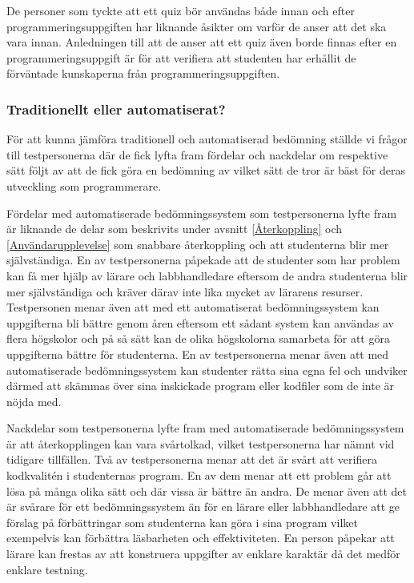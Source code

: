 \documentclass[a4paper,11pt]{article}
\begin{document}
{De personer som tyckte att ett quiz bör användas både innan och efter programmeringsuppgiften har liknande åsikter om varför de anser att det ska vara innan. Anledningen till att de anser att ett quiz även borde finnas efter en programmeringsuppgift är för att verifiera att studenten har erhållit de förväntade kunskaperna från programmeringsuppgiften. 

\subsubsection{Traditionellt eller automatiserat?}

För att kunna jämföra traditionell och automatiserad bedömning ställde vi frågor till testpersonerna där de fick lyfta fram fördelar och nackdelar om respektive sätt följt av att de fick göra en bedömning av vilket sätt de tror är bäst för deras utveckling som programmerare.

Fördelar med automatiserade bedömningssystem som testpersonerna lyfte fram är liknande de delar som beskrivits under avsnitt \ref{Återkoppling} och \ref{Användarupplevelse} som snabbare återkoppling och att studenterna blir mer självständiga. En av testpersonerna påpekade att de studenter som har problem kan få mer hjälp av lärare och labbhandledare eftersom de andra studenterna blir mer självständiga och kräver därav inte lika mycket av lärarens resurser. Testpersonen menar även att med ett automatiserat bedömningssystem kan uppgifterna bli bättre genom åren eftersom ett sådant system kan användas av flera högskolor och på så sätt kan de olika högskolorna samarbeta för att göra uppgifterna bättre för studenterna. En av testpersonerna menar även att med automatiserade bedömningssystem kan studenter rätta sina egna fel och undviker därmed att skämmas över sina inskickade program eller kodfiler som de inte är nöjda med.

Nackdelar som testpersonerna lyfte fram med automatiserade bedömningssystem är att återkopplingen kan vara svårtolkad, vilket testpersonerna har nämnt vid tidigare tillfällen. Två av testpersonerna menar att det är svårt att verifiera kodkvalitén i studenternas program. En av dem menar att ett problem går att lösa på många olika sätt och där vissa är bättre än andra. De menar även att det är svårare för ett bedömningssystem än för en lärare eller labbhandledare att ge förslag på förbättringar som studenterna kan göra i sina program vilket exempelvis kan förbättra läsbarheten och effektiviteten. En person påpekar att lärare kan frestas av att konstruera uppgifter av enklare karaktär då det medför enklare testning.

}
\end{document}
